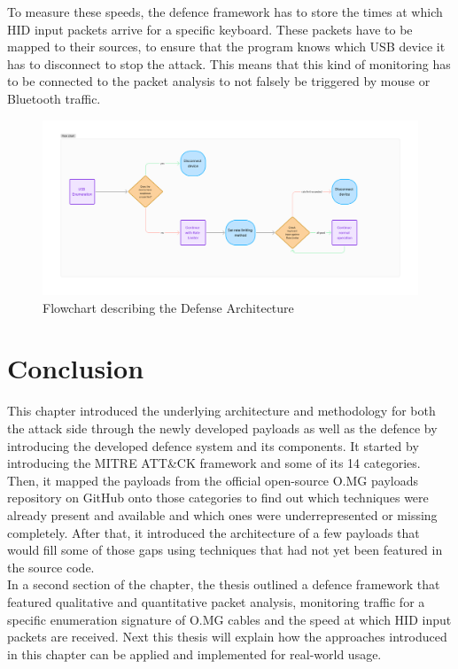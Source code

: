 To measure these speeds, the defence framework has to store the times at which HID input packets arrive for a specific keyboard. These packets have to be mapped to their sources, to ensure that the program knows which USB device it has to disconnect to stop the attack. This means that this kind of monitoring has to be connected to the packet analysis to not falsely be triggered by mouse or Bluetooth traffic. 


\begin{figure}[H]
    \centering
    \includegraphics[width=0.75\linewidth]{visuals/defense_flowchart.png}
    \caption{Flowchart describing the Defense Architecture}
    \label{fig:defense_flowchart}
\end{figure}


\section{Conclusion}

This chapter introduced the underlying architecture and methodology for both the attack side through the newly developed payloads as well as the defence by introducing the developed defence system and its components. 
It started by introducing the MITRE ATT\&CK framework and some of its 14 categories. Then, it mapped the payloads from the official open-source O.MG payloads repository on GitHub onto those categories to find out which techniques were already present and available and which ones were underrepresented or missing completely. After that, it introduced the architecture of a few payloads that would fill some of those gaps using techniques that had not yet been featured in the source code. \\
In a second section of the chapter, the thesis outlined a defence framework that featured qualitative and quantitative packet analysis, monitoring traffic for a specific enumeration signature of O.MG cables and the speed at which HID input packets are received. Next this thesis will explain how the approaches introduced in this chapter can be applied and implemented for real-world usage. 



